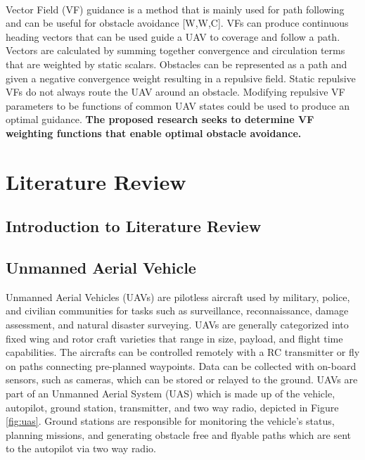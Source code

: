 \documentclass[numbered,pdftex]{ohio-etd}
\begin{document}
\\
Vector Field (VF) guidance is a method that is mainly used for path following and can be useful for obstacle avoidance [W,W,C]. VFs can produce continuous heading vectors that can be used guide a UAV to coverage and follow a path. Vectors are calculated by summing together convergence and circulation terms that are weighted by static scalars. Obstacles can be represented as a path and given a negative convergence weight resulting in a repulsive field. Static repulsive VFs do not always route the UAV around an obstacle. Modifying repulsive VF parameters to be functions of common UAV states could be used to produce an optimal guidance. \textbf{The proposed research seeks to determine VF weighting functions that enable optimal obstacle avoidance.}



 \pagebreak
 
 





\chapter{Literature Review}
\section{Introduction to Literature Review}


\section{Unmanned Aerial Vehicle}

Unmanned Aerial Vehicles (UAVs) are pilotless aircraft used by military, police, and civilian communities for tasks such as surveillance, reconnaissance, damage assessment, and natural disaster surveying.  UAVs are generally categorized into fixed wing and rotor craft varieties that range in size, payload, and flight time capabilities. The aircrafts can be controlled remotely with a RC transmitter or fly on paths connecting pre-planned waypoints. Data can be collected with on-board sensors, such as cameras, which can be stored or relayed to the ground. UAVs are part of an Unmanned Aerial System (UAS) which is made up of the vehicle, autopilot, ground station, transmitter, and two way radio, depicted in Figure \ref{fig:uas}. Ground stations are responsible for monitoring the vehicle's status, planning missions, and generating obstacle free and flyable paths which are sent to the autopilot via two way radio. 
\end{document}
